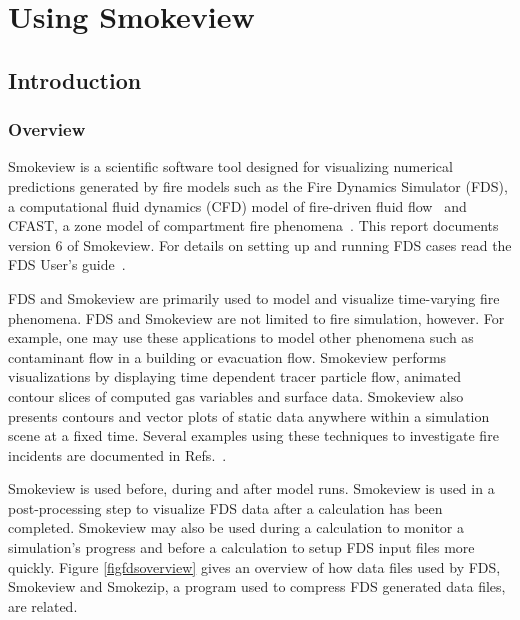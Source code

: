 \documentclass[11pt,twoside]{book}
\begin{document}
\cleardoublepage
\tableofcontents

\cleardoublepage
\listoffigures

\cleardoublepage
\listoftables

\mainmatter



\part{Using Smokeview}
\chapter{Introduction}
\section{Overview}
Smokeview is a scientific software tool designed for visualizing
numerical predictions generated by fire models such as the Fire
Dynamics Simulator (FDS), a computational fluid dynamics (CFD)
model of fire-driven fluid flow~\cite{FDS_Tech_Guide} and CFAST, a
zone model of compartment fire phenomena~\cite{CFAST_Tech_Guide_6}. This
report documents version 6 of Smokeview. For details on setting up
and running FDS cases read the FDS User's
guide~\cite{FDS_Users_Guide}.

FDS and Smokeview are primarily used to model and visualize
time-varying fire phenomena. FDS and Smokeview are not limited to
fire simulation, however. For example, one may use these
applications to model other phenomena such as contaminant flow in
a building or evacuation flow. Smokeview performs visualizations
by displaying time dependent tracer particle flow, animated
contour slices of computed gas variables and surface data.
Smokeview also presents contours and vector plots of static data
anywhere within a simulation scene at a fixed time. Several
examples using these techniques to investigate fire incidents are
documented in Refs.~\cite{CHERRYROAD,Iowa,HOUSTON,WTC}.

Smokeview is used before, during and after model runs. Smokeview
is used in a post-processing step to visualize FDS data after a
calculation has been completed. Smokeview  may also be used during
a calculation to monitor a simulation's progress and before a
calculation to setup FDS input files more quickly.  Figure
\ref{figfdsoverview} gives an overview of how data files used by
FDS,  Smokeview and Smokezip, a program used to compress FDS
generated data files, are related.
\end{document}

